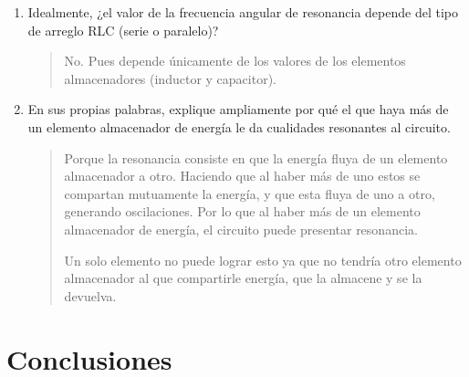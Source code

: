 \documentclass{article}
\begin{document}
\begin{enumerate}
\begin{quote}
            Además de cambiar su proporcionalidad. Pues si bien en serie mayor resistencia implica mayor amortiguamiento, en paralelo mayor resistencia implica menor amortiguamiento, por el hecho que a mayor resistencia en paralelo será menor la corriente que pasa por el circuito, y por ende menor la disipación de energía.
        \end{quote}

        \item Idealmente, ¿el valor de la frecuencia angular de resonancia depende del tipo de arreglo RLC (serie o paralelo)?
        
        \begin{quote}
            No. Pues depende únicamente de los valores de los elementos almacenadores (inductor y capacitor).
        \end{quote}

        \item En sus propias palabras, explique ampliamente por qué el que haya más de un elemento almacenador de energía le da cualidades resonantes al circuito.

        \begin{quote}
            Porque la resonancia consiste en que la energía fluya de un elemento almacenador a otro. Haciendo que al haber más de uno estos se compartan mutuamente la energía, y que esta fluya de uno a otro, generando oscilaciones. Por lo que al haber más de un elemento almacenador de energía, el circuito puede presentar resonancia.

            Un solo elemento no puede lograr esto ya que no tendría otro elemento almacenador al que compartirle energía, que la almacene y se la devuelva.
        \end{quote}
    \end{enumerate}

    \section{Conclusiones}
\end{document}
